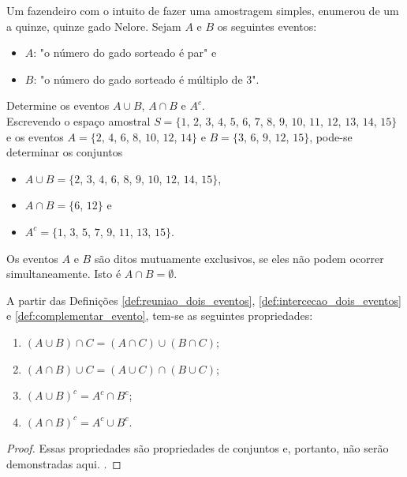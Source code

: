\begin{example}
	Um fazendeiro com o intuito de fazer uma amostragem simples, enumerou de um a quinze, quinze gado Nelore. Sejam $A$ e $B$ os seguintes eventos:
	\begin{itemize}
		\item $A$: "o número do gado sorteado é par" e
		\item $B$: "o número do gado sorteado é múltiplo de 3".
	\end{itemize}
	
	Determine os eventos $A\cup B$, $A\cap B$ e $A^{c}$.\\
	
	Escrevendo o espaço amostral $S=\{1$, $2$, $3$, $4$, $5$, $6$, $7$, $8$, $9$, $10$, $11$, $12$, $13$, $14$, $15\}$ e os eventos $A=\{2$, $4$, $6$, $8$, $10$, $12$, $14\}$ e $B=\{3$, $6$, $9$, $12$, $15\}$, pode-se determinar os conjuntos
	\begin{itemize}
		\item $A\cup B=\{2$, $3$, $4$, $6$, $8$, $9$, $10$, $12$, $14$, $15\}$,
		\item $A\cap B=\{6$, $12\}$ e
		\item $A^{c}=\{1$, $3$, $5$, $7$, $9$, $11$, $13$, $15\}$.
	\end{itemize}
\end{example}

\begin{remark}
	Os eventos $A$ e $B$ são ditos mutuamente exclusivos, se eles não podem ocorrer simultaneamente. Isto é $A\cap B=\emptyset$.
\end{remark}

\begin{theorem}
	A partir das Definições \ref{def:reuniao_dois_eventos}, \ref{def:intercecao_dois_eventos} e \ref{def:complementar_evento}, tem-se as seguintes propriedades:
	\begin{enumerate}
		\item $(A\cup B)\cap C = (A\cap C)\cup (B\cap C)$;
		\item $(A\cap B)\cup C = (A\cup C)\cap (B\cup C)$;
		\item $(A\cup B)^c = A^c \cap B^c$;
		\item $(A\cap B)^c= A^c\cup B^c$.
	\end{enumerate}
	
	\begin{proof}
		Essas propriedades são propriedades de conjuntos e, portanto, não serão demonstradas aqui. .
	\end{proof}
\end{theorem}

